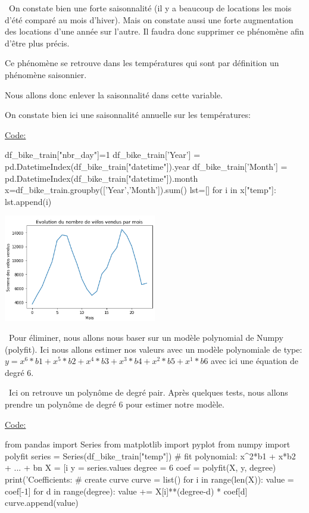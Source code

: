 \documentclass[a4paper,oneside,11pt]{article}
\begin{document}
\ On constate bien une forte saisonnalité (il y a beaucoup de locations les mois d'été comparé au mois d'hiver). Mais on constate aussi une forte augmentation des locations d'une année sur l'autre. Il faudra donc supprimer ce phénomène afin d'être plus précis.

Ce phénomène se retrouve dans les températures qui sont par définition un phénomène saisonnier.

Nous allons donc enlever la saisonnalité dans cette variable.

On constate bien ici une saisonnalité annuelle sur les températures:

\underline{Code:}
\begin{code-Python}
df_bike_train["nbr_day"]=1
df_bike_train['Year'] = pd.DatetimeIndex(df_bike_train["datetime"]).year
df_bike_train['Month'] = pd.DatetimeIndex(df_bike_train["datetime"]).month
x=df_bike_train.groupby(['Year','Month']).sum()
lst=[]
for i in x["temp"]:
    lst.append(i)
\end{code-Python} 

\includegraphics[width=0.5\textwidth]{image_rapport/tempt_fct_mois}

\ Pour éliminer, nous allons nous baser sur un modèle polynomial de Numpy (polyfit).
Ici nous allons estimer nos valeurs avec un modèle polynomiale de type:
$y=x^{6}*b1+x^{5}*b2+x^{4}*b3+x^{3}*b4+x^{2}*b5+x^{1}*b6$
avec ici une équation de degré 6.

\ Ici on retrouve un polynôme de degré pair. Après quelques tests, nous allons prendre un polynôme de degré 6 pour estimer notre modèle.

\underline{Code:}
\begin{code-Python}
from pandas import Series
from matplotlib import pyplot
from numpy import polyfit
series = Series(df_bike_train["temp"])
# fit polynomial: x^2*b1 + x*b2 + ... + bn
X = [i%
y = series.values
degree = 6
coef = polyfit(X, y, degree)
print('Coefficients: %
# create curve
curve = list()
for i in range(len(X)):
    value = coef[-1]
    for d in range(degree):
        value += X[i]**(degree-d) * coef[d]
    curve.append(value)
\end{code-Python}
\end{document}
